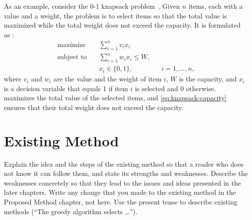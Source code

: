 As an example, consider the 0-1 knapsack problem~\cite{kellerer2004knapsack}.
Given $n$ items, each with a value and a weight, the problem is to select items
so that the total value is maximized while the total weight does not exceed the capacity.
It is formulated as :
\begin{align}
  \text{maximize}   \quad & \sum_{i=1}^{n} v_i x_i \label{eq:knapsack-objective} \\
  \text{subject to} \quad & \sum_{i=1}^{n} w_i x_i \le W, \label{eq:knapsack-capacity} \\
                          & x_i \in \{0, 1\}, && i = 1, \dots, n, \label{eq:knapsack-binary}
\end{align}
where $v_i$ and $w_i$ are the value and the weight of item $i$, $W$ is the capacity,
and $x_i$ is a decision variable that equals 1 if item $i$ is selected and 0 otherwise.
 maximizes the total value of the selected items,
and \cref{eq:knapsack-capacity} ensures that their total weight does not exceed the capacity.


\section{Existing Method}
\label{sec:greedy}

\begin{writingnote}
Explain the idea and the steps of the existing method so that a reader who does not know it can follow them,
and state its strengths and weaknesses.
Describe the weaknesses concretely so that they lead to the issues and ideas presented in the later chapters.
Write any change that you made to the existing method in the Proposed Method chapter, not here.
Use the present tense to describe existing methods (``The greedy algorithm selects \ldots'').
\end{writingnote}

